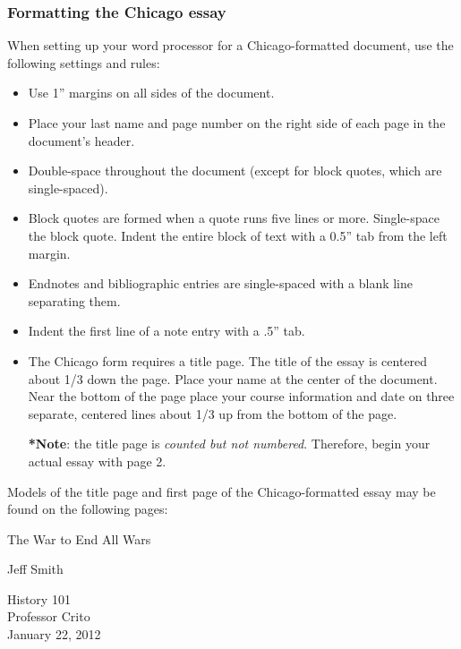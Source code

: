 \documentclass[12pt, hidelinks]{article} %
\begin{document}
\subsubsection {Formatting the Chicago essay}

When setting up your word processor for a Chicago-formatted document, use the following settings and rules:

\begin{itemize}

\item Use 1'' margins on all sides of the document.
\item Place your last name and page number on the right side of each page in the document's header.
\item Double-space throughout the document (except for block quotes, which are single-spaced).
\item Block quotes are formed when a quote runs five lines or more. Single-space the block quote. Indent the entire block of text with a 0.5'' tab from the left margin.
\item Endnotes and bibliographic entries are single-spaced with a blank line separating them.
\item Indent the first line of a note entry with a .5'' tab.
\item The Chicago form requires a title page. The title of the essay is centered about 1/3 down the page. Place your name at the center of the document. Near the bottom of the page place your course information and date on three separate, centered lines about 1/3 up from the bottom of the page.

\textbf{*}\textbf{Note}: the title page is \emph{counted but not numbered}. Therefore, begin your actual essay with page 2.
\end{itemize}

Models of the title page and first page of the Chicago-formatted essay may be found on the following pages:

\newpage
\thispagestyle{empty}
\begin{doublespace}
\vspace* {3cm}
\begin{center}The War to End All Wars\end{center}
\vspace {4cm}
\begin{center}Jeff Smith\end{center}
\vspace {7.2cm}
\begin{center}History 101\\
Professor Crito\\
January 22, 2012\end{center}
\end{doublespace}
\newpage
\end{document}
